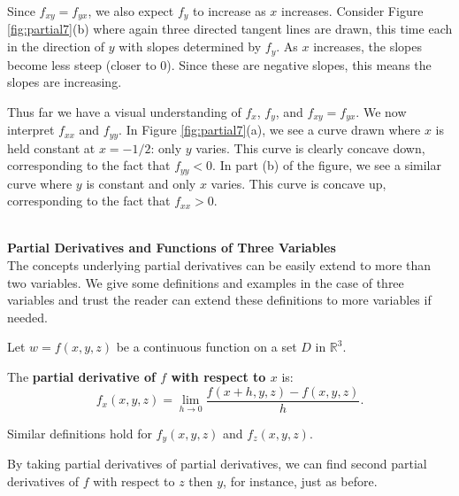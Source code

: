 {Since $f_{xy}=f_{yx}$, we also expect $f_y$ to increase as $x$ increases. Consider Figure \ref{fig:partial7}(b) where again three directed tangent lines are drawn, this time each in the direction of $y$ with slopes determined by $f_y$. As $x$ increases, the slopes become less steep (closer to 0). Since these are negative slopes, this means the slopes are increasing.

Thus far we have a visual understanding of $f_x$, $f_y$, and $f_{xy}=f_{yx}$. We now interpret $f_{xx}$ and $f_{yy}$. In Figure \ref{fig:partial7}(a), we see a curve drawn where $x$ is held constant at $x=-1/2$: only $y$ varies. This curve is clearly concave down, corresponding to the fact that $f_{yy}<0$. In part (b) of the figure, we see a similar curve where $y$ is constant and only $x$ varies. This curve is concave up, corresponding to the fact that $f_{xx}>0$.
 }\\

\noindent\textbf{\large Partial Derivatives and Functions of Three Variables}\\

The concepts underlying partial derivatives can be easily extend to more than two variables. We give some definitions and examples in the case of three variables and trust the reader can extend these definitions to more variables if needed.

{Let $w=f(x,y,z)$ be a continuous function on a set $D$ in $\mathbb{R}^3$. 

The \textbf{partial derivative of $f$ with respect to $x$} is:
	$$f_x(x,y,z) = \lim_{h\to 0} \frac{f(x+h,y,z)-f(x,y,z)}{h}.$$
	
	Similar definitions hold for $f_y(x,y,z)$ and $f_z(x,y,z)$.
}

By taking partial derivatives of partial derivatives, we can find second partial derivatives of $f$ with respect to $z$ then $y$, for instance, just as before.\\

